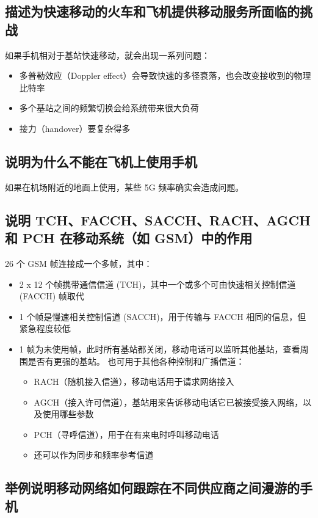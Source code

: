\subsection{描述为快速移动的火车和飞机提供移动服务所面临的挑战}

如果手机相对于基站快速移动，就会出现一系列问题：

\begin{itemize}
	\item 多普勒效应（Doppler effect）会导致快速的多径衰落，也会改变接收到的物理比特率
	\item 多个基站之间的频繁切换会给系统带来很大负荷
	\item 接力（handover）要复杂得多
\end{itemize}

\subsection{说明为什么不能在飞机上使用手机}

如果在机场附近的地面上使用，某些 5G 频率确实会造成问题。

\subsection{说明 TCH、FACCH、SACCH、RACH、AGCH 和 PCH 在移动系统（如 GSM）中的作用}

26 个 GSM 帧连接成一个多帧，其中：

\begin{itemize}
	\item  2 x 12 个帧携带通信信道 (TCH)，其中一个或多个可由快速相关控制信道 (FACCH) 帧取代
	\item 1 个帧是慢速相关控制信道 (SACCH)，用于传输与 FACCH 相同的信息，但紧急程度较低
	\item 1 帧为未使用帧，此时所有基站都关闭，移动电话可以监听其他基站，查看周围是否有更强的基站。	也可用于其他各种控制和广播信道：
		\begin{itemize}
			\item RACH（随机接入信道），移动电话用于请求网络接入
			\item AGCH（接入许可信道），基站用来告诉移动电话它已被接受接入网络，以及使用哪些参数
			\item PCH（寻呼信道），用于在有来电时呼叫移动电话
			\item 还可以作为同步和频率参考信道
		\end{itemize}
\end{itemize}

\subsection{举例说明移动网络如何跟踪在不同供应商之间漫游的手机}

